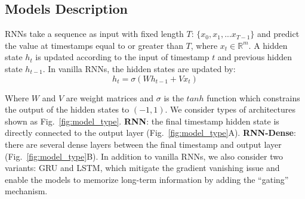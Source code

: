 \subsection{Models Description}
\label{section:model_description}
RNNs take a sequence as input with fixed length $T$: $\{x_0, x_1,... x_{T-1}\}$ and predict the value at timestamps equal to or greater than $T$, where $x_{t} \in \mathbb R^{m}$. 
A hidden state $h_t$ is updated according to the input of timestamp $t$ and previous hidden state $h_{t-1}$.
In vanilla RNNs, the hidden states are updated by:
\begin{equation} 
h_t = \sigma(Wh_{t-1} + Vx_t)
\end{equation}

Where $W$ and $V$ are weight matrices and $\sigma$ is the $tanh$ function which constrains the output of the hidden states to $(-1, 1)$. We consider  types of architectures shown as Fig.~\ref{fig:model_type}. 
\textbf{RNN}: the final timestamp hidden state is directly connected to the output layer (Fig.~\ref{fig:model_type}A). \textbf{RNN-Dense}: there are several dense layers between the final timestamp and output layer (Fig.~\ref{fig:model_type}B). 
In addition to vanilla RNNs, we also consider two variants: GRU and LSTM, which mitigate the gradient vanishing issue and enable the models to memorize long-term information by adding the ``gating'' mechanism.

